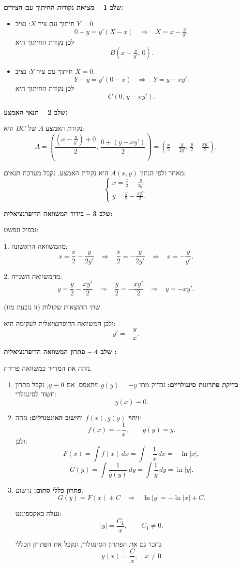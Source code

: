 \documentclass{article}
\numberwithin{equation}{section}
\begin{document}
\textbf{שלב 1 – מציאת נקודות החיתוך עם הצירים:}

\begin{itemize}
  \item חיתוך עם ציר $X$: נציב $Y=0$.  
  \[
  0 - y = y'(X - x) \;\;\;\Rightarrow\;\;\; X = x - \tfrac{y}{y'}.
  \]
  לכן נקודת החיתוך היא 
  \[
  B\left(x-\tfrac{y}{y'},\,0\right).
  \]

  \item חיתוך עם ציר $Y$: נציב $X=0$.  
  \[
  Y - y = y'(0 - x) \;\;\;\Rightarrow\;\;\; Y = y - x y'.
  \]
  לכן נקודת החיתוך היא 
  \[
  C\left(0,\,y-xy'\right).
  \]
\end{itemize}

\textbf{שלב 2 – תנאי האמצע:}  

נקודת האמצע $A$ של $BC$ היא:
\[
A = \left(\frac{(x-\tfrac{y}{y'})+0}{2},\,\frac{0+(y-xy')}{2}\right)
= \left(\tfrac{x}{2}-\tfrac{y}{2y'},\,\tfrac{y}{2}-\tfrac{xy'}{2}\right).
\]

מאחר ולפי הנתון $A(x,y)$ היא נקודת האמצע, נקבל מערכת תנאים:
\[
\begin{cases}
x = \tfrac{x}{2}-\tfrac{y}{2y'} \\
y = \tfrac{y}{2}-\tfrac{xy'}{2}.
\end{cases}
\]

\textbf{שלב 3 – בידוד המשוואה הדיפרנציאלית:}  

נכפיל ונפשט:

1. מהמשוואה הראשונה:
\[
x = \frac{x}{2}-\frac{y}{2y'} \;\;\;\Rightarrow\;\;\; \frac{x}{2} = -\frac{y}{2y'} \;\;\;\Rightarrow\;\;\; x = -\frac{y}{y'}.
\]

2. מהמשוואה השנייה:
\[
y = \frac{y}{2}-\frac{xy'}{2} \;\;\;\Rightarrow\;\;\; \frac{y}{2} = -\frac{xy'}{2} \;\;\;\Rightarrow\;\;\; y=-xy'.
\]

שתי התוצאות שקולות (זו נובעת מזו).  

ולכן המשוואה הדיפרנציאלית לעקומה היא:
\[
y' = -\frac{y}{x}.
\]

\textbf{שלב 4 – פתרון המשוואה הדיפרנציאלית :}

נזהה את המד׳׳ר כמשוואה פרידה.

\begin{enumerate}[label=\arabic*.]

\item \textbf{בדיקת פתרונות סינגולריים:}  
נבדוק מתי $g(y)=-y$ מתאפס.  
אם $y\equiv 0$, נקבל פתרון חשוד לסינגולרי:  
\[
y(x)\equiv 0.
\]

\item \textbf{זיהוי $f(x),g(y)$ וחישוב האינטגרלים:}  
נזהה:
\[
f(x)=-\frac{1}{x}, \qquad g(y)=y.
\]
ולכן:
\[
F(x)=\int f(x)\,dx=\int -\frac{1}{x}\,dx=-\ln|x|,
\]
\[
G(y)=\int \frac{1}{g(y)}\,dy=\int \frac{1}{y}\,dy=\ln|y|.
\]

\item \textbf{פתרון כללי סתום:}  
נרשום:
\[
G(y)=F(x)+C \;\;\;\Rightarrow\;\;\; \ln|y|=-\ln|x|+C.
\]

נעלה באקספוננט:
\[
|y|=\frac{C_1}{x}, \qquad C_1\neq 0.
\]

נחבר גם את הפתרון הסינגולרי, ונקבל את הפתרון הכללי:
\[
\boxed{\,y(x)=\frac{C}{x}, \quad  x\neq 0.}
\]

\end{enumerate}
\end{document}
